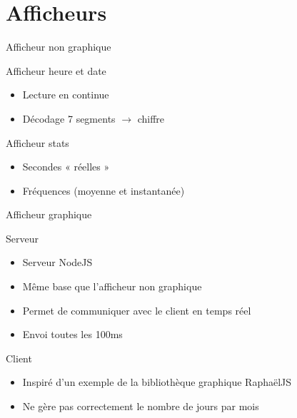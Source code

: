 \documentclass{beamer}
\begin{document}
\section{Afficheurs}
\begin{frame}{Afficheur non graphique}
	\begin{block}{Afficheur heure et date}
		\begin{itemize}
			\item Lecture en continue
			\item Décodage 7 segments $\rightarrow$ chiffre
		\end{itemize}
	\end{block}
	
	\pause
	
	\begin{block}{Afficheur stats}
		\begin{itemize}
			\item Secondes « réelles »
			\item Fréquences (moyenne et instantanée)
		\end{itemize}
	\end{block}
\end{frame}


\begin{frame}{Afficheur graphique}
	\begin{block}{Serveur}
		\begin{itemize}
			\item Serveur NodeJS
			\item Même base que l'afficheur non graphique
			\item Permet de communiquer avec le client en temps réel
			\item Envoi toutes les 100ms
		\end{itemize}
	\end{block}
	
	\pause
	
	\begin{block}{Client}
		\begin{itemize}
			\item Inspiré d'un exemple de la bibliothèque graphique RaphaëlJS
			\item Ne gère pas correctement le nombre de jours par mois
		\end{itemize}
	\end{block}
\end{frame}
\end{document}
